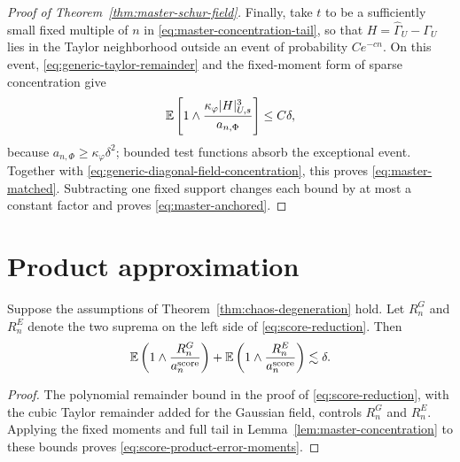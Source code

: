 \begin{proof}[Proof of Theorem~\ref{thm:master-schur-field}]
Finally, take $t$ to be a sufficiently small fixed multiple of $n$ in
\eqref{eq:master-concentration-tail}, so that
$H=\hat\Gamma_U-\Gamma_U$ lies in the Taylor neighborhood outside an
event of probability $Ce^{-cn}$.  On this event,
\eqref{eq:generic-taylor-remainder} and the fixed-moment form of sparse
concentration give
\[
 \mathbb E\left[1\wedge
 \frac{\kappa_\varphi|H|_{U,s}^3}{a_{n,\Phi}}\right]
 \le C\delta,
\]
because $a_{n,\Phi}\ge\kappa_\varphi\delta^2$; bounded test functions
absorb the exceptional event.  Together with
\eqref{eq:generic-diagonal-field-concentration}, this proves
\eqref{eq:master-matched}.  Subtracting one fixed support changes each
bound by at most a constant factor and proves \eqref{eq:master-anchored}.
\end{proof}

\section{Product approximation}\label{app:product-proofs}

\begin{lemma}\label{lem:score-product-error}
Suppose the assumptions of Theorem~\ref{thm:chaos-degeneration} hold.
Let $R_n^G$ and $R_n^E$ denote the two suprema on the
left side of \eqref{eq:score-reduction}.  Then
\begin{equation}\label{eq:score-product-error-moments}
 \mathbb E\left(1\wedge\frac{R_n^G}{a_n^{\mathrm{score}}}\right)
 +\mathbb E\left(1\wedge\frac{R_n^E}{a_n^{\mathrm{score}}}\right)
 \lesssim\delta.
\end{equation}
\end{lemma}

\begin{proof}
The polynomial remainder bound in the proof of
\eqref{eq:score-reduction}, with the cubic Taylor remainder added for the
Gaussian field, controls $R_n^G$ and $R_n^E$.  Applying the fixed moments
and full tail in Lemma~\ref{lem:master-concentration} to these bounds proves
\eqref{eq:score-product-error-moments}.
\end{proof}

